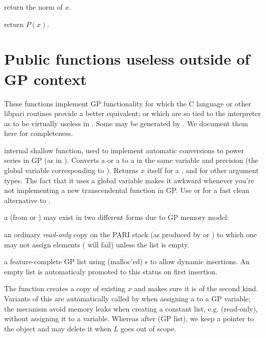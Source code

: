  return the
norm of $x$.

return $P(x)$.

\section{Public functions useless outside of GP context}

These functions implement GP functionality for which the C language or
other libpari routines provide a better equivalent; or which are so tied
to the  interpreter as to be virtually useless in . Some
may be generated by . We document them here for completeness.


 internal shallow function, used to implement
automatic conversions to power series in GP (as in ).
Converts a  or a  to a  in the same variable and
precision  (the global variable corresponding to
). Returns $x$ itself for a , and 
for other argument types. The fact that it uses a global variable makes it
awkward whenever you're not implementing a new transcendental function in GP.
Use  or  for a fast clean alternative to
.

 a  (from  or ) may
exist in two different forms due to GP memory model:

\item an ordinary \emph{read-only} copy on the PARI stack (as produced by
 or ) to which one may not assign elements
( will fail) unless the list is empty.

\item a feature-complete GP list using (malloc'ed) s to
allow dynamic insertions. An empty list is automaticaly promoted to this
status on first insertion.

The  function creates a copy of existing  $x$ and
makes sure it is of the second kind. Variants of this are automatically
called by  when assigning a  to a GP variable; the
mecanism avoid memory leaks when creating a constant list, e.g.
 (read-only), without assigning it to a variable. Whereas
after  (GP list), we keep a pointer to the object and
may delete it when $L$ goes out of scope.

